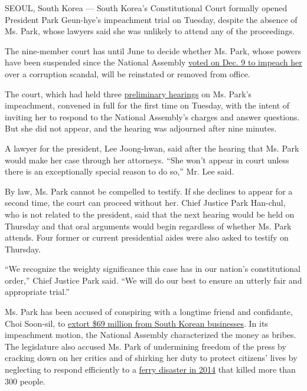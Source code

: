 SEOUL, South Korea --- South Korea's Constitutional Court formally
opened President Park Geun-hye's impeachment trial on Tuesday, despite
the absence of Ms. Park, whose lawyers said she was unlikely to attend
any of the proceedings.

The nine-member court has until June to decide whether Ms. Park, whose
powers have been suspended since the National Assembly
\href{http://www.nytimes3xbfgragh.onion/2016/12/09/world/asia/south-korea-president-park-geun-hye-impeached.html}{voted
on Dec. 9 to impeach her} over a corruption scandal, will be reinstated
or removed from office.

The court, which had held three
\href{http://www.nytimes3xbfgragh.onion/2016/12/22/world/asia/south-korea-president-park-impeachment.html}{preliminary
hearings} on Ms. Park's impeachment, convened in full for the first time
on Tuesday, with the intent of inviting her to respond to the National
Assembly's charges and answer questions. But she did not appear, and the
hearing was adjourned after nine minutes.

A lawyer for the president, Lee Joong-hwan, said after the hearing that
Ms. Park would make her case through her attorneys. ``She won't appear
in court unless there is an exceptionally special reason to do so,'' Mr.
Lee said.

By law, Ms. Park cannot be compelled to testify. If she declines to
appear for a second time, the court can proceed without her. Chief
Justice Park Han-chul, who is not related to the president, said that
the next hearing would be held on Thursday and that oral arguments would
begin regardless of whether Ms. Park attends. Four former or current
presidential aides were also asked to testify on Thursday.

``We recognize the weighty significance this case has in our nation's
constitutional order,'' Chief Justice Park said. ``We will do our best
to ensure an utterly fair and appropriate trial.''

Ms. Park has been accused of conspiring with a longtime friend and
confidante, Choi Soon-sil, to
\href{http://www.nytimes3xbfgragh.onion/2017/01/02/world/asia/south-korea-park-geun-hye-samsung.html}{extort
\$69 million from South Korean businesses}. In its impeachment motion,
the National Assembly characterized the money as bribes. The legislature
also accused Ms. Park of undermining freedom of the press by cracking
down on her critics and of shirking her duty to protect citizens' lives
by neglecting to respond efficiently to a
\href{http://www.nytimes3xbfgragh.onion/interactive/2015/04/12/world/asia/12ferry-timeline.html}{ferry
disaster in 2014} that killed more than 300 people.

